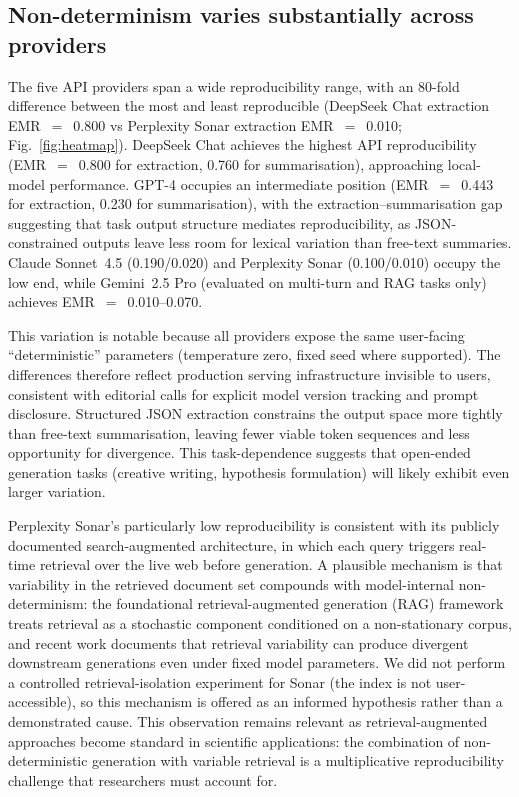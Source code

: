 \documentclass[sn-nature]{sn-jnl}
\begin{document}
\subsection{Non-determinism varies substantially across providers}\label{subsec:providers}

The five API providers span a wide reproducibility range, with an 80-fold difference between the most and least reproducible (DeepSeek Chat extraction EMR~$=$~0.800 vs Perplexity Sonar extraction EMR~$=$~0.010; Fig.~\ref{fig:heatmap}).
DeepSeek Chat achieves the highest API reproducibility (EMR~$=$~0.800 for extraction, 0.760 for summarisation), approaching local-model performance.
GPT-4 occupies an intermediate position (EMR~$=$~0.443 for extraction, 0.230 for summarisation), with the extraction--summarisation gap suggesting that task output structure mediates reproducibility, as JSON-constrained outputs leave less room for lexical variation than free-text summaries.
Claude Sonnet~4.5 (0.190/0.020) and Perplexity Sonar (0.100/0.010) occupy the low end, while Gemini~2.5 Pro (evaluated on multi-turn and RAG tasks only) achieves EMR~$=$~0.010--0.070.

This variation is notable because all providers expose the same user-facing ``deterministic'' parameters (temperature zero, fixed seed where supported).
The differences therefore reflect production serving infrastructure invisible to users, consistent with editorial calls for explicit model version tracking and prompt disclosure\cite{editorial2024framework}.
Structured JSON extraction constrains the output space more tightly than free-text summarisation, leaving fewer viable token sequences and less opportunity for divergence.
This task-dependence suggests that open-ended generation tasks (creative writing, hypothesis formulation) will likely exhibit even larger variation.

Perplexity Sonar's particularly low reproducibility is consistent with its publicly documented search-augmented architecture\cite{perplexitysonar2024}, in which each query triggers real-time retrieval over the live web before generation.
A plausible mechanism is that variability in the retrieved document set compounds with model-internal non-determinism: the foundational retrieval-augmented generation (RAG) framework\cite{lewis2020rag} treats retrieval as a stochastic component conditioned on a non-stationary corpus, and recent work documents that retrieval variability can produce divergent downstream generations even under fixed model parameters\cite{gao2024rag}.
We did not perform a controlled retrieval-isolation experiment for Sonar (the index is not user-accessible), so this mechanism is offered as an informed hypothesis rather than a demonstrated cause.
This observation remains relevant as retrieval-augmented approaches become standard in scientific applications: the combination of non-deterministic generation with variable retrieval is a multiplicative reproducibility challenge that researchers must account for.
\end{document}
